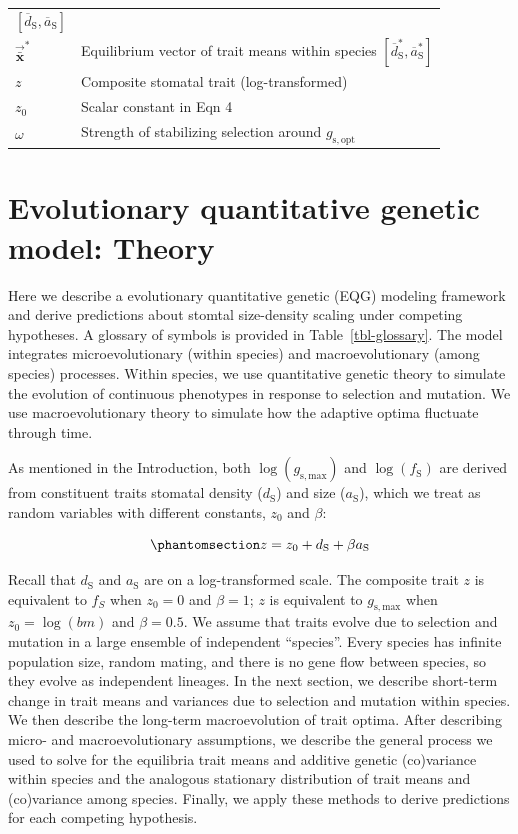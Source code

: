\documentclass[
  letterpaper,
  DIV=11,
  numbers=noendperiod]{scrartcl}
\begin{document}
\begin{longtable}[]{@{}
  >{\raggedright\arraybackslash}p{}
  >{\raggedright\arraybackslash}p{}@{}}
\([\overline{d}_\mathrm{S}, \overline{a}_\mathrm{S}]\) \\
\(\vec{\bar{\mathbf{x}}}^*\) & Equilibrium vector of trait means within
species \([\overline{d}_\mathrm{S}^*, \overline{a}_\mathrm{S}^*]\) \\
\(z\) & Composite stomatal trait (log-transformed) \\
\(z_0\) & Scalar constant in Eqn 4 \\
\(\omega\) & Strength of stabilizing selection around
\(g_\mathrm{s,opt}\) \\
\end{longtable}

\section{Evolutionary quantitative genetic model:
Theory}\label{sec-theory}

Here we describe a evolutionary quantitative genetic (EQG) modeling
framework and derive predictions about stomtal size-density scaling
under competing hypotheses. A glossary of symbols is provided in
Table~\ref{tbl-glossary}. The model integrates microevolutionary (within
species) and macroevolutionary (among species) processes. Within
species, we use quantitative genetic theory to simulate the evolution of
continuous phenotypes in response to selection and mutation. We use
macroevolutionary theory to simulate how the adaptive optima fluctuate
through time.

As mentioned in the Introduction, both \(\log (g_\mathrm{s,max})\) and
\(\log (f_\mathrm{S})\) are derived from constituent traits stomatal
density (\(d_\mathrm{S}\)) and size (\(a_\mathrm{S}\)), which we treat
as random variables with different constants, \(z_0\) and \(\beta\):

\begin{equation}\phantomsection\label{eq-z}{z = z_0 + d_\mathrm{S} + \beta a_\mathrm{S}}\end{equation}

Recall that \(d_\mathrm{S}\) and \(a_\mathrm{S}\) are on a
log-transformed scale. The composite trait \(z\) is equivalent to
\(f_S\) when \(z_0 = 0\) and \(\beta = 1\); \(z\) is equivalent to
\(g_\mathrm{s,max}\) when \(z_0 = \log(bm)\) and \(\beta = 0.5\). We
assume that traits evolve due to selection and mutation in a large
ensemble of independent ``species''. Every species has infinite
population size, random mating, and there is no gene flow between
species, so they evolve as independent lineages. In the next section, we
describe short-term change in trait means and variances due to selection
and mutation within species. We then describe the long-term
macroevolution of trait optima. After describing micro- and
macroevolutionary assumptions, we describe the general process we used
to solve for the equilibria trait means and additive genetic
(co)variance within species and the analogous stationary distribution of
trait means and (co)variance among species. Finally, we apply these
methods to derive predictions for each competing hypothesis.
\end{document}
